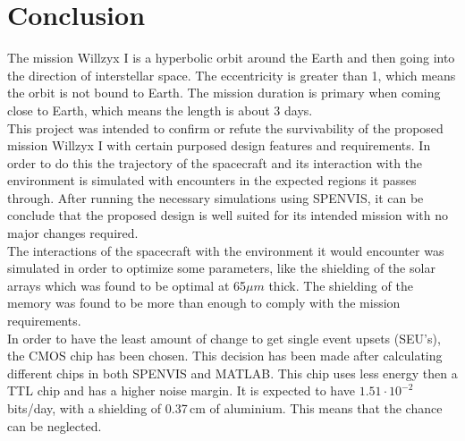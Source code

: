 
\section{\label{sec:conclusion}Conclusion}

The mission Willzyx I is a hyperbolic orbit around the Earth and then going into the direction of interstellar space. The eccentricity is greater than 1, which means the orbit is not bound to Earth. The mission duration is primary when coming close to Earth, which means the length is about 3 days.\\

This project was intended to confirm or refute the survivability of the proposed mission Willzyx I with certain purposed design features and requirements. In order to do this the trajectory of the spacecraft and its interaction with the environment is simulated with encounters in the expected regions it passes through. After running the necessary simulations using SPENVIS, it can be conclude that the proposed design is well suited for its intended mission with no major changes required.\\

The interactions of the spacecraft with the environment it would encounter was simulated in order to optimize some parameters, like the shielding of the solar arrays which was found to be optimal at 65$\mu m$ thick. The shielding of the memory was found to be more than enough to comply with the mission requirements. \\

In order to have the least amount of change to get single event upsets (SEU's), the CMOS chip has been chosen. This decision has been made after calculating different chips in both SPENVIS and MATLAB. This chip uses less energy then a TTL chip and has a higher noise margin. It is expected to have $1.51 \cdot 10^{-2}$\,bits/day, with a shielding of 0.37\,cm of aluminium. This means that the chance can be neglected.